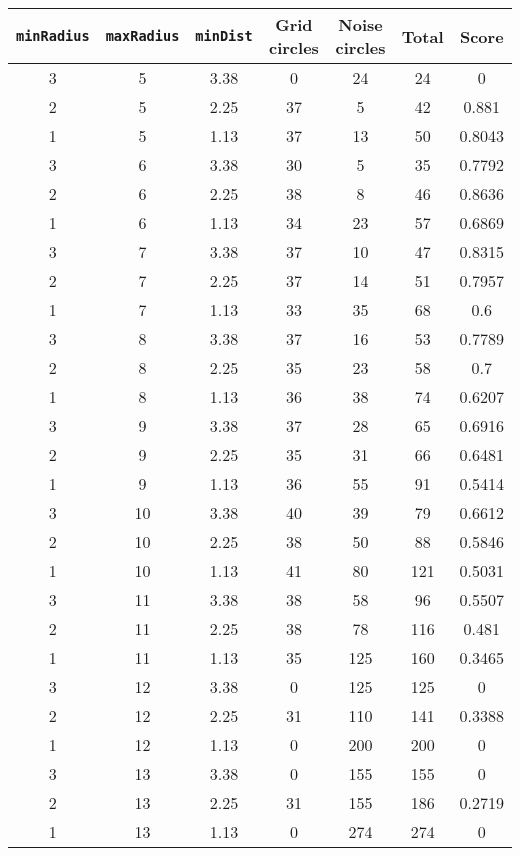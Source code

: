 \documentclass[letterpaper, 12pt]{article}
\begin{document}
\begin{longtable}{|c|c|c|c|c|c|c|}
\hline
\textbf{\texttt{minRadius}} & \textbf{\texttt{maxRadius}} & \textbf{\texttt{minDist}} & \textbf{Grid circles} & \textbf{Noise circles} & \textbf{Total} & \textbf{Score} \\
\hline
3 & 5 & 3.38 & 0 & 24 & 24 & 0 \\
\hline
2 & 5 & 2.25 & 37 & 5 & 42 & 0.881 \\
\hline
1 & 5 & 1.13 & 37 & 13 & 50 & 0.8043 \\
\hline
3 & 6 & 3.38 & 30 & 5 & 35 & 0.7792 \\
\hline
2 & 6 & 2.25 & 38 & 8 & 46 & 0.8636 \\
\hline
1 & 6 & 1.13 & 34 & 23 & 57 & 0.6869 \\
\hline
3 & 7 & 3.38 & 37 & 10 & 47 & 0.8315 \\
\hline
2 & 7 & 2.25 & 37 & 14 & 51 & 0.7957 \\
\hline
1 & 7 & 1.13 & 33 & 35 & 68 & 0.6 \\
\hline
3 & 8 & 3.38 & 37 & 16 & 53 & 0.7789 \\
\hline
2 & 8 & 2.25 & 35 & 23 & 58 & 0.7 \\
\hline
1 & 8 & 1.13 & 36 & 38 & 74 & 0.6207 \\
\hline
3 & 9 & 3.38 & 37 & 28 & 65 & 0.6916 \\
\hline
2 & 9 & 2.25 & 35 & 31 & 66 & 0.6481 \\
\hline
1 & 9 & 1.13 & 36 & 55 & 91 & 0.5414 \\
\hline
3 & 10 & 3.38 & 40 & 39 & 79 & 0.6612 \\
\hline
2 & 10 & 2.25 & 38 & 50 & 88 & 0.5846 \\
\hline
1 & 10 & 1.13 & 41 & 80 & 121 & 0.5031 \\
\hline
3 & 11 & 3.38 & 38 & 58 & 96 & 0.5507 \\
\hline
2 & 11 & 2.25 & 38 & 78 & 116 & 0.481 \\
\hline
1 & 11 & 1.13 & 35 & 125 & 160 & 0.3465 \\
\hline
3 & 12 & 3.38 & 0 & 125 & 125 & 0 \\
\hline
2 & 12 & 2.25 & 31 & 110 & 141 & 0.3388 \\
\hline
1 & 12 & 1.13 & 0 & 200 & 200 & 0 \\
\hline
3 & 13 & 3.38 & 0 & 155 & 155 & 0 \\
\hline
2 & 13 & 2.25 & 31 & 155 & 186 & 0.2719 \\
\hline
1 & 13 & 1.13 & 0 & 274 & 274 & 0 \\

\end{longtable}
\end{document}
